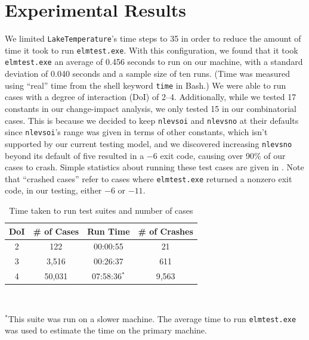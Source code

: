 \documentclass[10pt,twocolumn]{article}
\begin{document}
\section{Experimental Results}
\label{sec:results}


We limited \verb|LakeTemperature|'s time steps to 35 in order to reduce
the amount of time it took to run \verb|elmtest.exe|. With this configuration, we found
that it took \verb|elmtest.exe| an average of 0.456 seconds to run on our machine, with a 
standard deviation of 0.040 seconds and a sample size of ten runs. (Time was measured 
using ``real'' time from the shell keyword \verb|time| in Bash.) We were able to run cases 
with a degree of interaction (DoI) of 2--4. Additionally, while we tested 17 constants in
our change-impact analysis, we only tested 15 in our combinatorial cases. This is because
we decided to keep \verb|nlevsoi| and \verb|nlevsno| at their defaults since \verb|nlevsoi|'s 
range was given in terms of other constants, which isn't supported by our current testing 
model, and we discovered increasing \verb|nlevsno| beyond its default of five resulted in 
a $-6$ exit code, causing over 90\% of our cases to crash. Simple statistics about running 
these test cases are given in . Note that ``crashed cases'' refer to 
cases where \verb|elmtest.exe| returned a nonzero exit code, in our testing, either $-6$ or 
$-11$.

\begin{table}[ht]
    {
        \centering
        \caption{Time taken to run test suites and number of cases}
        \label{tab:test_time}
        \begin{tabular}{c c c c}
            \toprule
            DoI & \# of Cases & Run Time & \# of Crashes \\
            \midrule
            2 & 122 & 00:00:55 & 21 \\
            3 & 3,516 & 00:26:37 & 611 \\
            4 & 50,031 & 07:58:36$^*$ & 9,563 \\
            \bottomrule
        \end{tabular} \\
    }
    \vspace{6pt}
    \footnotesize
    $^*$This suite was run on a slower machine. The average time to run \verb|elmtest.exe|
    was used to estimate the time on the primary machine.
\end{table}
\end{document}
